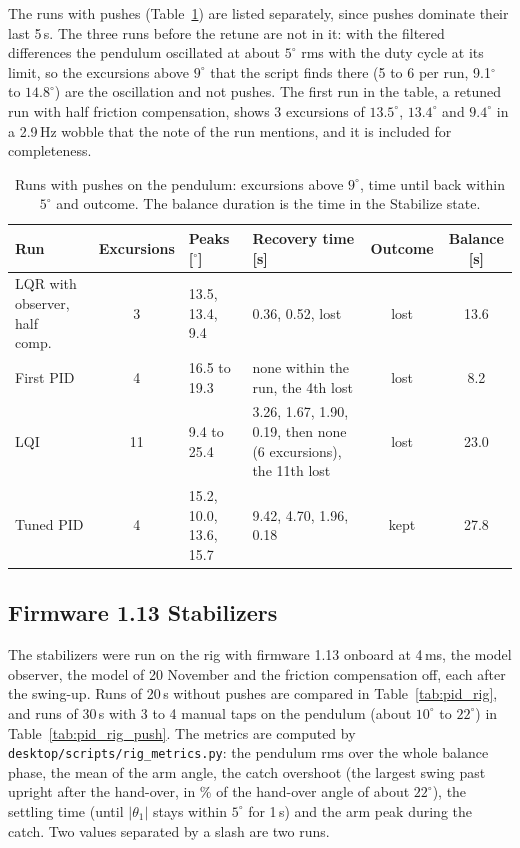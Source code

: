 \documentclass[a4paper,11pt]{article}
\begin{document}
The runs with pushes (Table~\ref{tab:cc_push}) are listed separately, since pushes dominate their last 5\,s. The three runs before the retune are not in it: with the filtered differences the pendulum oscillated at about $5^\circ$ rms with the duty cycle at its limit, so the excursions above $9^\circ$ that the script finds there (5 to 6 per run, 9.1$^\circ$ to $14.8^\circ$) are the oscillation and not pushes. The first run in the table, a retuned run with half friction compensation, shows 3 excursions of $13.5^\circ$, $13.4^\circ$ and $9.4^\circ$ in a 2.9\,Hz wobble that the note of the run mentions, and it is included for completeness.

\begin{table}[htbp]
\centering
\caption{Runs with pushes on the pendulum: excursions above $9^\circ$, time until back within $5^\circ$ and outcome. The balance duration is the time in the Stabilize state.}
\label{tab:cc_push}
\footnotesize
\setlength{\tabcolsep}{3pt}
\begin{tabular}{@{}p{}cp{}p{}cc@{}}
\toprule
Run & Excursions & Peaks [$^\circ$] & Recovery time [s] & Outcome & Balance [s] \\
\midrule
LQR with observer, half comp.\ & 3 & 13.5, 13.4, 9.4 & 0.36, 0.52, lost & lost & 13.6 \\
First PID & 4 & 16.5 to 19.3 & none within the run, the 4th lost & lost & 8.2 \\
LQI & 11 & 9.4 to 25.4 & 3.26, 1.67, 1.90, 0.19, then none (6 excursions), the 11th lost & lost & 23.0 \\
Tuned PID & 4 & 15.2, 10.0, 13.6, 15.7 & 9.42, 4.70, 1.96, 0.18 & kept & 27.8 \\
\bottomrule
\end{tabular}
\end{table}

\subsection{Firmware 1.13 Stabilizers}
\label{sec:pid_rig}
The stabilizers were run on the rig with firmware 1.13 onboard at 4\,ms, the model observer, the model of 20 November and the friction compensation off, each after the swing-up. Runs of 20\,s without pushes are compared in Table~\ref{tab:pid_rig}, and runs of 30\,s with 3 to 4 manual taps on the pendulum (about $10^\circ$ to $22^\circ$) in Table~\ref{tab:pid_rig_push}. The metrics are computed by \nolinkurl{desktop/scripts/rig_metrics.py}: the pendulum rms over the whole balance phase, the mean of the arm angle, the catch overshoot (the largest swing past upright after the hand-over, in \% of the hand-over angle of about $22^\circ$), the settling time (until $|\theta_1|$ stays within $5^\circ$ for 1\,s) and the arm peak during the catch. Two values separated by a slash are two runs.
\end{document}
